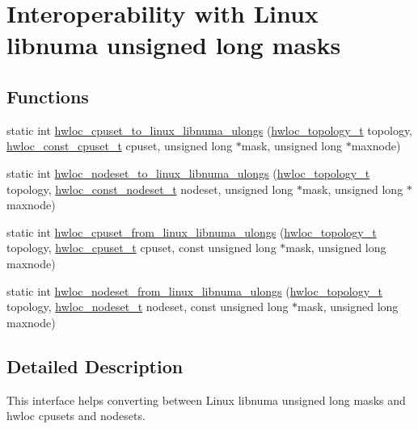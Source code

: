 \hypertarget{a00215}{}\section{Interoperability with Linux libnuma unsigned long masks}
\label{a00215}
\subsection*{Functions}
\begin{DoxyCompactItemize}
\item 
static int \hyperlink{a00215_gae577962390f84b0b12f503314ab0f972}{hwloc\+\_\+cpuset\+\_\+to\+\_\+linux\+\_\+libnuma\+\_\+ulongs} (\hyperlink{a00186_ga9d1e76ee15a7dee158b786c30b6a6e38}{hwloc\+\_\+topology\+\_\+t} topology, \hyperlink{a00183_ga1f784433e9b606261f62d1134f6a3b25}{hwloc\+\_\+const\+\_\+cpuset\+\_\+t} cpuset, unsigned long $\ast$mask, unsigned long $\ast$maxnode)
\item 
static int \hyperlink{a00215_ga585ccf818d2f217f4e53f9c6506c3128}{hwloc\+\_\+nodeset\+\_\+to\+\_\+linux\+\_\+libnuma\+\_\+ulongs} (\hyperlink{a00186_ga9d1e76ee15a7dee158b786c30b6a6e38}{hwloc\+\_\+topology\+\_\+t} topology, \hyperlink{a00183_ga2f5276235841ad66a79bedad16a5a10c}{hwloc\+\_\+const\+\_\+nodeset\+\_\+t} nodeset, unsigned long $\ast$mask, unsigned long $\ast$maxnode)
\item 
static int \hyperlink{a00215_ga0e9d051e068940f722f6fdc61814149d}{hwloc\+\_\+cpuset\+\_\+from\+\_\+linux\+\_\+libnuma\+\_\+ulongs} (\hyperlink{a00186_ga9d1e76ee15a7dee158b786c30b6a6e38}{hwloc\+\_\+topology\+\_\+t} topology, \hyperlink{a00183_ga4bbf39b68b6f568fb92739e7c0ea7801}{hwloc\+\_\+cpuset\+\_\+t} cpuset, const unsigned long $\ast$mask, unsigned long maxnode)
\item 
static int \hyperlink{a00215_gad8491c672eb2594cc5e7b0a026867192}{hwloc\+\_\+nodeset\+\_\+from\+\_\+linux\+\_\+libnuma\+\_\+ulongs} (\hyperlink{a00186_ga9d1e76ee15a7dee158b786c30b6a6e38}{hwloc\+\_\+topology\+\_\+t} topology, \hyperlink{a00183_ga37e35730fa7e775b5bb0afe893d6d508}{hwloc\+\_\+nodeset\+\_\+t} nodeset, const unsigned long $\ast$mask, unsigned long maxnode)
\end{DoxyCompactItemize}


\subsection{Detailed Description}
This interface helps converting between Linux libnuma unsigned long masks and hwloc cpusets and nodesets.

